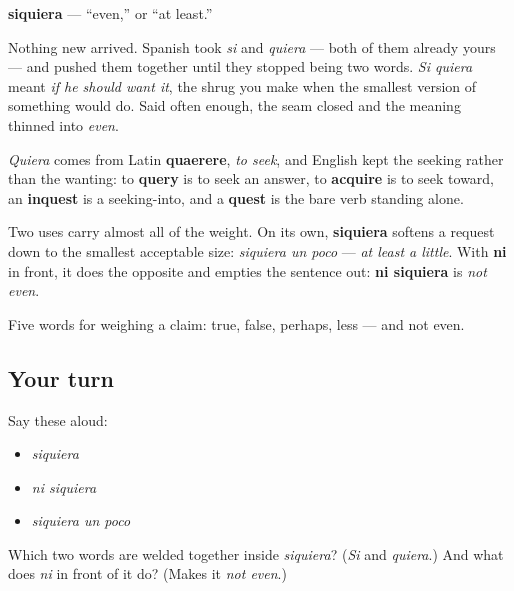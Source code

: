 \begin{cousinweb}
\textbf{siquiera} — \textquotedblleft{}even,\textquotedblright{} or \textquotedblleft{}at least.\textquotedblright{}

Nothing new arrived. Spanish took \emph{si} and \emph{quiera} — both of them already yours — and pushed them together until they stopped being two words. \emph{Si quiera} meant \emph{if he should want it}, the shrug you make when the smallest version of something would do. Said often enough, the seam closed and the meaning thinned into \emph{even}.

\emph{Quiera} comes from Latin \textbf{quaerere}, \emph{to seek}, and English kept the seeking rather than the wanting: to \textbf{query} is to seek an answer, to \textbf{acquire} is to seek toward, an \textbf{inquest} is a seeking-into, and a \textbf{quest} is the bare verb standing alone.

Two uses carry almost all of the weight. On its own, \textbf{siquiera} softens a request down to the smallest acceptable size: \emph{siquiera un poco} — \emph{at least a little}. With \textbf{ni} in front, it does the opposite and empties the sentence out: \textbf{ni siquiera} is \emph{not even}.
\end{cousinweb}

\begin{grammarlens}[title={What you've built}]
Five words for weighing a claim: true, false, perhaps, less — and not even.
\end{grammarlens}

\subsection*{Your turn}
Say these aloud:

\begin{itemize}
\raggedright
  \item \emph{siquiera}
  \item \emph{ni siquiera}
  \item \emph{siquiera un poco}
\end{itemize}

\begin{tcolorbox}[breakable,colback=teal!4,colframe=teal!35!black,title={Before you move on}]
Which two words are welded together inside \emph{siquiera}? (\emph{Si} and \emph{quiera}.) And what does \emph{ni} in front of it do? (Makes it \emph{not even}.)
\end{tcolorbox}
